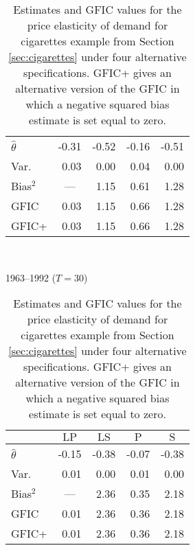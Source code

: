 \begin{table}[h]
\begin{subtable}[h]{0.45\textwidth}
\begin{tabular}{lrrrr}
        \hline
        $\widehat{\theta}$ & -0.31 & -0.52 &  -0.16 &  -0.51\\
        Var.\ & 0.03 &  0.00 & 0.04 & 0.00\\ 
        Bias$^2$ & \multicolumn{1}{c}{---} & 1.15 & 0.61 & 1.28 \\
        GFIC  & 0.03 & 1.15 & 0.66  & 1.28   \\
        GFIC+  & 0.03 &  1.15 & 0.66  & 1.28    \\
        \hline
      \end{tabular}
    \end{subtable}
     ~
    \begin{subtable}[h]{0.45\textwidth}
      \centering
     \caption{1963--1992 ($T=30$)}
     \label{tab:cigarettesFullappend}
     \begin{tabular}{lrrrr}\hline\hline 
         & \multicolumn{1}{c}{$\text{LP}$} & \multicolumn{1}{c}{$\text{LS}$} 
          & \multicolumn{1}{c}{$\text{P}$} & \multicolumn{1}{c}{$\text{S}$}\\
        \hline
        $\widehat{\theta}$ & -0.15 & -0.38 &  -0.07 &  -0.38\\
        Var.\ & 0.01 & 0.00 & 0.01 & 0.00\\ 
        Bias$^2$ & \multicolumn{1}{c}{---} & 2.36 & 0.35 & 2.18\\
        GFIC  & 0.01 & 2.36 & 0.36 &  2.18\\
        GFIC+  & 0.01 & 2.36 & 0.36  & 2.18  \\
           \hline
      \end{tabular}     
    \end{subtable}
    \caption{Estimates and GFIC values for the price elasticity of demand for cigarettes example from Section \ref{sec:cigarettes} under four alternative specifications. GFIC+ gives an alternative version of the GFIC in which a negative squared bias estimate is set equal to zero.}
    \label{tab:cigarettesappend}
\end{table}

